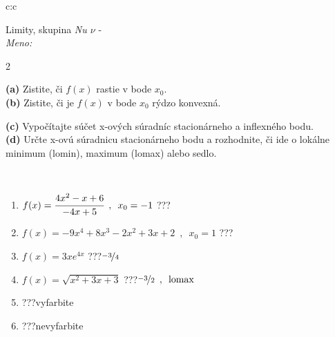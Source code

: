 \documentclass[10pt]{report}
\begin{document}
\begin{tabular}{c:c}
\begin{minipage}[c][104.5mm][t]{0.5\linewidth}
\begin{center}
\vspace{7mm}
{\huge Limity, skupina \textit{Nu $\nu$} -}\\[5mm]
\textit{Meno:}\phantom{xxxxxxxxxxxxxxxxxxxxxxxxxxxxxxxxxxxxxxxxxxxxxxxxxxxxxxxxxxxxxxxxx}\\[5mm]
\begin{minipage}{0.95\linewidth}
\begin{center}
{\small \begin{multicols}{2} \raggedright
\textbf{(a)} Zistite, či \(f(x)\) rastie v bode \(x_0\). \\[1mm]
\textbf{(b)} Zistite, či je \(f(x)\) v bode \(x_0\) rýdzo konvexná. \par \columnbreak
\textbf{(c)} Vypočítajte súčet x-ových súradníc stacionárneho a inflexného bodu. \\[1mm]
\textbf{(d)} Určte x-ovú súradnicu stacionárneho bodu a rozhodnite, či ide o lokálne minimum (lomin), maximum (lomax) alebo sedlo. \\[1mm]
\end{multicols}
}
\end{center}
\end{minipage}
\\[4mm]
\begin{minipage}{0.79\linewidth}
\begin{center}
\begin{varwidth}{\linewidth}
\begin{enumerate}
\normalsize
\item $f(x)=\cfrac{4x^2-x+6}{-4x+5}\enspace , \enspace x_0=-1$\quad \dotfill\; ???\;\dotfill \quad {}
\item $f(x)=-9x^4+8x^3-2x^2+3x+2\enspace , \enspace x_0=1$\quad \dotfill\; ???\;\dotfill \quad {}
\item $f(x)=3xe^{4x}$\quad \dotfill\; ???\;\dotfill \quad $\nicefrac{-3}{4}$
\item $f(x)=\sqrt{x^2+3x+3}$\quad \dotfill\; ???\;\dotfill \quad $\nicefrac{-3}{2}\enspace , \enspace\text{lomax}$
\item \quad \dotfill\; ???\;\dotfill \quad vyfarbite
\item \quad \dotfill\; ???\;\dotfill \quad nevyfarbite
\end{enumerate}
\end{varwidth}
\end{center}

\end{minipage}
\end{center}
\end{minipage}
\end{tabular}
\end{document}
